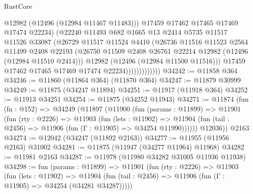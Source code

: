 \begin{lexlean}{RustCore}
\begin{coremodule}
                              @12982
                              (@12496 (@12984 @11467 @11483)))
                            @17459
                            @17462
                            @17465
                            @17469
                            @17474
                            @22234)
                          (@22240
                            @11493
                            @682
                            @1665
                            @13
                            @2414
                            @5735
                            @11517
                            @11526
                            @33087
                            (@26729
                              @11517
                              @11524
                              @4410
                              (@26736
                                @11516
                                @11523
                                @2564
                                @11499
                                @2408
                                @22193
                                (@26750
                                  @11509
                                  @2408
                                  @26761
                                  @22214
                                  @12982
                                  (@12496 (@12984 @11510 @2414)))
                                @12982
                                (@12496 (@12984 @11500 @11516)))
                              @17459
                              @17462
                              @17465
                              @17469
                              @17474
                              @22234)))))))))))))
@34242 := @11858 @364
@34246 := @11860 (@11864 @364) (@11870 @364)
@34247 := @11879 @30999
@34249 := @11875 (@34247 @11894)
@34251 := @11917 (@11918 @364)
@34252 := @11913 @34251
@34254 := @11875 (@34252 @11943)
@34271 := @11874
    (fun (fn : @152) =>
    @34249
      (@11897
        (@11900
          (fun (params : @11899) =>
          @11901
            (fun (rty : @2226) =>
            @11903
              (fun (lets : @11902) =>
              @11904 (fun (tail : @2456) => @11906 (fun (Γ : @11905) => @34254 @11990))))))
        @12036))
    @2163
@34274 := @12042 (@34247 (@11892 @2163))
@34277 := @11955 (@11956 @2163) @31002
@34281 := @11875 (@11947 (@34277 @11964) @11968)
@34282 := @11981 @2163
@34287 := @11978 (@11980 @34282 @31005 @11936 @11938)
@34298 := fun (params : @11899) =>
  @11901
    (fun (rty : @2226) =>
    @11903
      (fun (lets : @11902) =>
      @11904 (fun (tail : @2456) => @11906 (fun (Γ : @11905) => @34254 (@34281 @34287)))))

\end{coremodule}
\end{lexlean}
